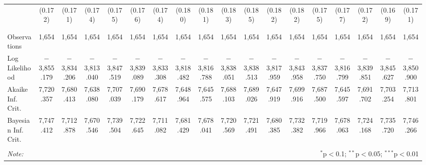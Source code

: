 \begin{table}[!htbp]
\begin{tabular}{@{\extracolsep{5pt}}lccccccccccccccccc}
  & (0.172) & (0.171) & (0.174) & (0.175) & (0.176) & (0.174) & (0.180) & (0.181) & (0.183) & (0.185) & (0.182) & (0.182) & (0.175) & (0.177) & (0.172) & (0.169) & (0.171) \\ 
  & & & & & & & & & & & & & & & & & \\ 
\hline \\[-1.8ex] 
Observations & 1,654 & 1,654 & 1,654 & 1,654 & 1,654 & 1,654 & 1,654 & 1,654 & 1,654 & 1,654 & 1,654 & 1,654 & 1,654 & 1,654 & 1,654 & 1,654 & 1,654 \\ 
Log Likelihood & $-$3,855.179 & $-$3,834.206 & $-$3,813.040 & $-$3,847.519 & $-$3,839.089 & $-$3,833.308 & $-$3,818.482 & $-$3,816.788 & $-$3,838.051 & $-$3,838.513 & $-$3,817.959 & $-$3,843.958 & $-$3,837.750 & $-$3,816.799 & $-$3,839.851 & $-$3,845.627 & $-$3,850.900 \\ 
Akaike Inf. Crit. & 7,720.357 & 7,680.413 & 7,638.080 & 7,707.039 & 7,690.179 & 7,678.617 & 7,648.964 & 7,645.575 & 7,688.103 & 7,689.026 & 7,647.919 & 7,699.916 & 7,687.500 & 7,645.597 & 7,691.702 & 7,703.254 & 7,713.801 \\ 
Bayesian Inf. Crit. & 7,747.412 & 7,712.878 & 7,670.546 & 7,739.504 & 7,722.645 & 7,711.082 & 7,681.429 & 7,678.041 & 7,720.569 & 7,721.491 & 7,680.385 & 7,732.382 & 7,719.966 & 7,678.063 & 7,724.168 & 7,735.720 & 7,746.266 \\ 
\hline 
\hline \\[-1.8ex] 
\textit{Note:}  & \multicolumn{17}{r}{$^{*}$p$<$0.1; $^{**}$p$<$0.05; $^{***}$p$<$0.01} \\ 
\end{tabular} 
\end{table} 
